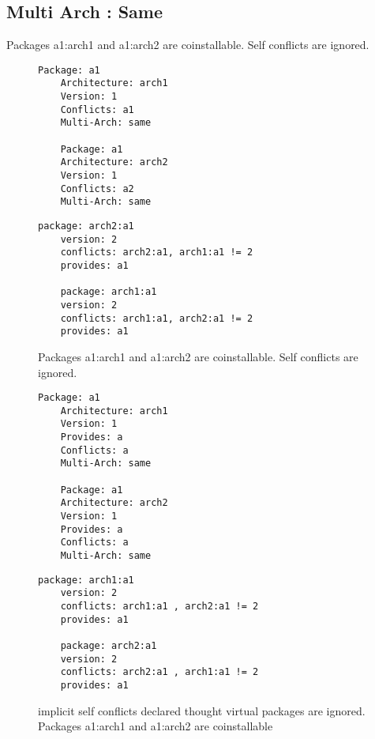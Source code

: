 \subsection{Multi Arch : Same}

Packages a1:arch1 and a1:arch2 are coinstallable. Self conflicts are
ignored.

\begin{figure}[h]
  \begin{minipage}[b]{0.45\linewidth}
    \begin{lstlisting}[style=debctrl]
    Package: a1
    Architecture: arch1
    Version: 1
    Conflicts: a1
    Multi-Arch: same

    Package: a1
    Architecture: arch2
    Version: 1
    Conflicts: a2
    Multi-Arch: same
    \end{lstlisting}
  \end{minipage}
  \begin{minipage}[b]{0.45\linewidth}
    \begin{lstlisting}[style=cudf]
    package: arch2:a1
    version: 2
    conflicts: arch2:a1, arch1:a1 != 2
    provides: a1

    package: arch1:a1
    version: 2
    conflicts: arch1:a1, arch2:a1 != 2
    provides: a1
    \end{lstlisting}
  \end{minipage}
\caption{Packages a1:arch1 and a1:arch2 are coinstallable. Self
conflicts are ignored.}
\label{fig:arch-same-1}
\end{figure}

\begin{figure}[h]
  \begin{minipage}[b]{0.45\linewidth}
    \begin{lstlisting}[style=debctrl]
    Package: a1
    Architecture: arch1
    Version: 1
    Provides: a
    Conflicts: a
    Multi-Arch: same

    Package: a1
    Architecture: arch2
    Version: 1
    Provides: a
    Conflicts: a
    Multi-Arch: same
    \end{lstlisting}
  \end{minipage}
  \begin{minipage}[b]{0.45\linewidth}
    \begin{lstlisting}[style=cudf]
    package: arch1:a1
    version: 2
    conflicts: arch1:a1 , arch2:a1 != 2
    provides: a1

    package: arch2:a1
    version: 2
    conflicts: arch2:a1 , arch1:a1 != 2
    provides: a1
    \end{lstlisting}
  \end{minipage}
\caption{implicit self conflicts declared thought virtual packages are
ignored. Packages a1:arch1 and a1:arch2 are coinstallable}
\label{fig:arch-same-2}
\end{figure}

